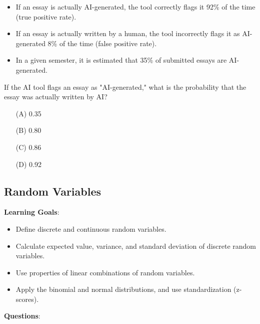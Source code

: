 \documentclass{article}
\begin{document}
\begin{enumerate}
    \begin{itemize}
        \item If an essay is actually AI-generated, the tool correctly flags it 92\% of the time (true positive rate).
        \item If an essay is actually written by a human, the tool incorrectly flags it as AI-generated 8\% of the time (false positive rate).
        \item In a given semester, it is estimated that 35\% of submitted essays are AI-generated. 
    \end{itemize}
    If the AI tool flags an essay as "AI-generated," what is the probability that the essay was actually written by AI?
    \begin{enumerate}
        \item[(A)] 0.35 
        \item[(B)] 0.80 
        \item[(C)] 0.86 
        \item[(D)] 0.92
    \end{enumerate}
\end{enumerate}


\subsection{Random Variables}
\textbf{Learning Goals}:
\begin{itemize}
    \item Define discrete and continuous random variables.
    \item Calculate expected value, variance, and standard deviation of discrete random variables.
    \item Use properties of linear combinations of random variables.
    \item Apply the binomial and normal distributions, and use standardization (z-scores).
\end{itemize}

\textbf{Questions}:
\end{document}
